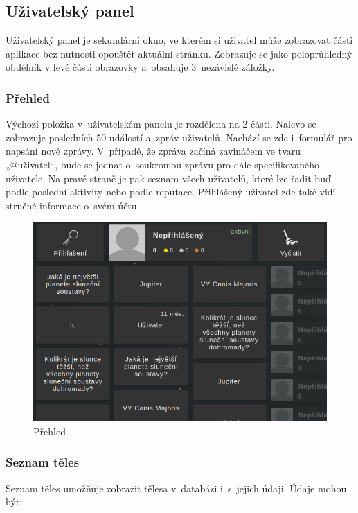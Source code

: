 \documentclass[a4paper,12pt]{article}
\begin{document}
\subsection{Uživatelský panel}

Uživatelský panel je sekundární okno, ve kterém si uživatel může zobrazovat části aplikace bez nutnosti opouštět aktuální stránku. Zobrazuje se jako poloprůhledný obdélník v levé části obrazovky a~obsahuje 3~nezávislé záložky.

\subsubsection{Přehled}

Výchozí položka v~uživatelském panelu je rozdělena na 2 části. Nalevo se zobrazuje posledních 50 událostí a~zpráv uživatelů. Nachází se zde i~formulář pro napsání nové zprávy. V~případě, že zpráva začíná zavináčem ve tvaru „@uživatel“, bude se jednat o~soukromou zprávu pro dále specifikovaného uživatele. Na pravé straně je pak seznam všech uživatelů, které lze řadit buď podle poslední aktivity nebo podle reputace. Přihlášený uživatel zde také vidí stručné informace o~svém účtu.

\begin{figure}[H]
\begin{center}
\includegraphics[width=350pt]{Images/Overview.png}
\caption{Přehled}
\end{center}
\end{figure}

\subsubsection{Seznam těles}

Seznam těles umožňuje zobrazit tělesa v~databázi i~s~jejich údaji. Údaje mohou být:
\end{document}
